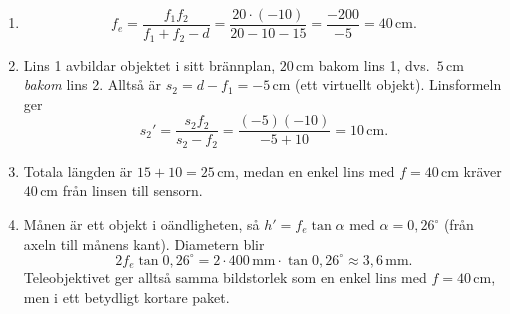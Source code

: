 \begin{enumerate}
  \item
  \[
    f_e = \frac{f_1 f_2}{f_1 + f_2 - d} = \frac{20 \cdot (-10)}{20 - 10 - 15} = \frac{-200}{-5} = 40\,\mathrm{cm}.
  \]
  \item Lins 1 avbildar objektet i sitt brännplan, $20\,\mathrm{cm}$ bakom lins 1, dvs.\ $5\,\mathrm{cm}$ \emph{bakom} lins 2. Alltså är $s_2 = d - f_1 = -5\,\mathrm{cm}$ (ett virtuellt objekt). Linsformeln ger
  \[
    s_2' = \frac{s_2 f_2}{s_2 - f_2} = \frac{(-5)(-10)}{-5 + 10} = 10\,\mathrm{cm}.
  \]
  \item Totala längden är $15 + 10 = 25\,\mathrm{cm}$, medan en enkel lins med $f = 40\,\mathrm{cm}$ kräver $40\,\mathrm{cm}$ från linsen till sensorn.
  \item Månen är ett objekt i oändligheten, så $h' = f_e \tan\alpha$ med $\alpha = 0{,}26^\circ$ (från axeln till månens kant). Diametern blir
  \[
    2 f_e \tan 0{,}26^\circ = 2 \cdot 400\,\mathrm{mm} \cdot \tan 0{,}26^\circ \approx 3{,}6\,\mathrm{mm}.
  \]
  Teleobjektivet ger alltså samma bildstorlek som en enkel lins med $f = 40\,\mathrm{cm}$, men i ett betydligt kortare paket.
\end{enumerate}
